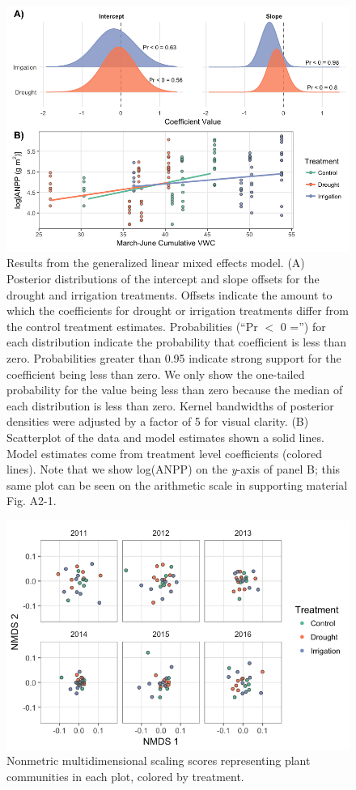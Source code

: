 \documentclass[fleqn,10pt,lineno]{wlpeerj} %
\begin{document}
\begin{figure}[!ht]
  \centering
      \includegraphics[width=5in]{../figures/glmm_main_results.png}
  \caption{Results from the generalized linear mixed effects model. (A) Posterior distributions of the intercept and slope offsets for the drought and irrigation treatments. Offsets indicate the amount to which the coefficients for drought or irrigation treatments differ from the control treatment estimates. Probabilities (``Pr $<$ 0 ='') for each distribution indicate the probability that coefficient is less than zero. Probabilities greater than 0.95 indicate strong support for the coefficient being less than zero. We only show the one-tailed probability for the value being less than zero because the median of each distribution is less than zero. Kernel bandwidths of posterior densities were adjusted by a factor of 5 for visual clarity. (B) Scatterplot of the data and model estimates shown a solid lines. Model estimates come from treatment level coefficients (colored lines). Note that we show log(ANPP) on the \emph{y}-axis of panel B; this same plot can be seen on the arithmetic scale in supporting material Fig. A2-1.}
\end{figure}

\newpage{}

\begin{figure}[!ht]
  \centering
      \includegraphics[width=5in]{../figures/sppcomp_bray_all.png}
  \caption{Nonmetric multidimensional scaling scores representing plant communities in each plot, colored by treatment.}
\end{figure}

\newpage{}



\end{document}

